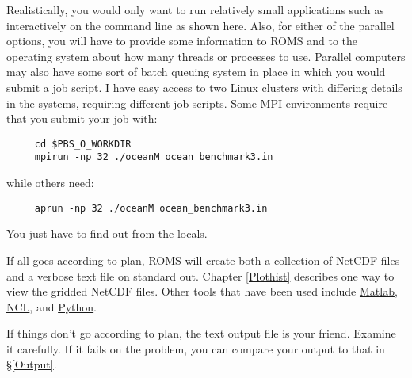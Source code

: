 Realistically, you would only want to run relatively small
applications such as  interactively on the command
line as shown here. Also, for either of the parallel options, you
will have to provide some information to ROMS and to the operating
system about how many threads or processes to use. Parallel
computers may also have some sort of batch queuing system in place
in which you would submit a job script. I have easy access to two
Linux clusters with differing details in the systems,
requiring different job scripts. Some MPI environments
require that you submit your job with:
\begin{verbatim}
     cd $PBS_O_WORKDIR
     mpirun -np 32 ./oceanM ocean_benchmark3.in
\end{verbatim}
while others need:
\begin{verbatim}
     aprun -np 32 ./oceanM ocean_benchmark3.in
\end{verbatim}
You just have to find out from the locals.

If all goes according to plan, ROMS will create both a collection
of NetCDF files and a verbose text file on standard out. Chapter
\ref{Plothist} describes one way to view the gridded NetCDF files.
Other tools that have been used include
\href{http://www.mathworks.com/products/matlab/}{Matlab},
\href{http://www.ncl.ucar.edu/}{NCL}, and
\href{http://www.python.org/}{Python}.

If things don't go according to plan, the text output file is your
friend. Examine it carefully. If it fails on the 
problem, you can compare your output to that in \S\ref{Output}.

